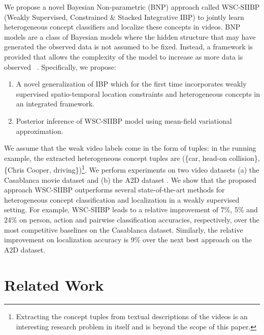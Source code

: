 \documentclass[runningheads]{llncs}
\begin{document}
We propose a novel Bayesian Non-parametric (BNP) approach called WSC-SIIBP (Weakly Supervised, Constrained \& Stacked Integrative IBP) to jointly learn heterogeneous concept classifiers and localize these concepts in videos. BNP models are a class of Bayesian models where the hidden structure that may have generated the observed data is not assumed to be fixed. Instead, a framework is provided that allows the complexity of the model to increase as more data is observed~ \cite{gershman2012tutorial}. Specifically, we propose: 
\vspace{-5mm}
\begin{enumerate}[leftmargin=*,noitemsep]
\item A novel generalization of IBP which for the first time incorporates weakly supervised spatio-temporal location constraints and heterogeneous concepts in an integrated framework.
\item Posterior inference of WSC-SIIBP model using mean-field variational approximation.
\end{enumerate}
\vspace{-2mm}

We assume that the weak video labels come in the form of tuples: in the running example, the extracted heterogeneous concept tuples are (\{car, head-on collision\}, \{Chris Cooper, driving\})\footnote{Extracting the concept tuples from textual descriptions of the videos is an interesting research problem in itself and is beyond the scope of this paper.}. We perform experiments on two video datasets (a) the Casablanca movie dataset \cite{bojanowski2013finding} and (b) the A2D dataset \cite{xu2015can}. We show that the proposed approach WSC-SIIBP outperforms several state-of-the-art methods for heterogeneous concept classification and localization in a weakly supervised setting. 
For example, WSC-SIIBP leads to a relative improvement of 7\%, 5\% and 24\% on person, action and pairwise classification accuracies, respectively, over the most competitive baselines on the Casablanca dataset. Similarly, the relative improvement on localization accuracy is 9\% over the next best approach on the A2D dataset.

\section{Related Work}
\end{document}
